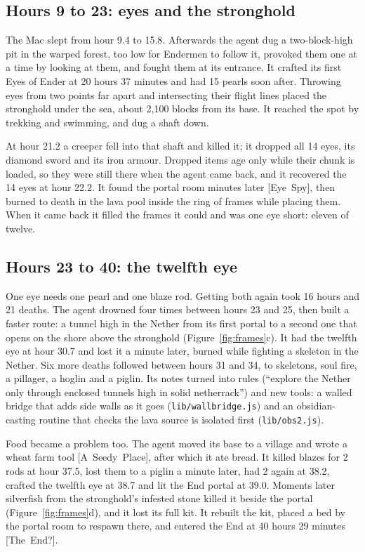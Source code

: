\documentclass[11pt,a4paper]{article}
\newcommand{\adv}[1]{\mbox{\textsf{[#1]}}}
\begin{document}
\subsection{Hours 9 to 23: eyes and the stronghold}

The Mac slept from hour 9.4 to 15.8. Afterwards the agent dug a two-block-high pit in the warped forest, too low for Endermen to follow it, provoked them one at a time by looking at them, and fought them at its entrance. It crafted its first Eyes of Ender at 20 hours 37 minutes and had 15 pearls soon after. Throwing eyes from two points far apart and intersecting their flight lines placed the stronghold under the sea, about 2,100 blocks from its base. It reached the spot by trekking and swimming, and dug a shaft down.

At hour 21.2 a creeper fell into that shaft and killed it; it dropped all 14 eyes, its diamond sword and its iron armour. Dropped items age only while their chunk is loaded, so they were still there when the agent came back, and it recovered the 14 eyes at hour 22.2. It found the portal room minutes later \adv{Eye Spy}, then burned to death in the lava pool inside the ring of frames while placing them. When it came back it filled the frames it could and was one eye short: eleven of twelve.

\subsection{Hours 23 to 40: the twelfth eye}

One eye needs one pearl and one blaze rod. Getting both again took 16 hours and 21 deaths. The agent drowned four times between hours 23 and 25, then built a faster route: a tunnel high in the Nether from its first portal to a second one that opens on the shore above the stronghold (Figure~\ref{fig:frames}c). It had the twelfth eye at hour 30.7 and lost it a minute later, burned while fighting a skeleton in the Nether. Six more deaths followed between hours 31 and 34, to skeletons, soul fire, a pillager, a hoglin and a piglin. Its notes turned into rules (``explore the Nether only through enclosed tunnels high in solid netherrack'') and new tools: a walled bridge that adds side walls as it goes (\texttt{lib/wallbridge.js}) and an obsidian-casting routine that checks the lava source is isolated first (\texttt{lib/obs2.js}).

Food became a problem too. The agent moved its base to a village and wrote a wheat farm tool \adv{A Seedy Place}, after which it ate bread. It killed blazes for 2 rods at hour 37.5, lost them to a piglin a minute later, had 2 again at 38.2, crafted the twelfth eye at 38.7 and lit the End portal at 39.0. Moments later silverfish from the stronghold's infested stone killed it beside the portal (Figure~\ref{fig:frames}d), and it lost its full kit. It rebuilt the kit, placed a bed by the portal room to respawn there, and entered the End at 40 hours 29 minutes \adv{The End?}.
\end{document}

